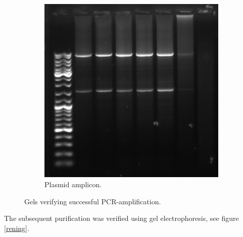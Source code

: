 \documentclass{article}
\begin{document}
\begin{multicols}{2}
\begin{figure}[H]
		\begin{subfigure}{0.7\linewidth}
			\includegraphics[width=\linewidth]{images/pscz1_efter_PCR.png}
			\caption{Plasmid amplicon.}
		\end{subfigure}
		\caption{Gels verifying successful PCR-amplification.}
		\label{ampl}
	\end{figure}
	
	\vfill\null
	\columnbreak
	
	The subsequent purification was verified using gel electrophoresis, see figure \ref{rening}.
	

\end{multicols}
\end{document}
